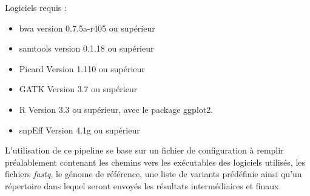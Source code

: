 \documentclass[12pt]{article}
\begin{document}
Logiciels requis :

\begin{itemize}
\item bwa version 0.7.5a-r405 ou supérieur
\item samtools version 0.1.18 ou supérieur
\item Picard Version 1.110 ou supérieur
\item GATK Version 3.7 ou supérieur
\item R Version 3.3 ou supérieur, avec le package ggplot2.
\item snpEff Version 4.1g ou supérieur
\end{itemize}


L'utilisation de ce pipeline se base sur un fichier de configuration à remplir préalablement contenant les chemins vers les exécutables des logiciels utilisés, les fichiers \textit{fastq}, le génome de référence, une liste de variants prédéfinie ainsi qu'un répertoire dans lequel seront envoyés les résultats intermédiaires et finaux.\\
\end{document}
